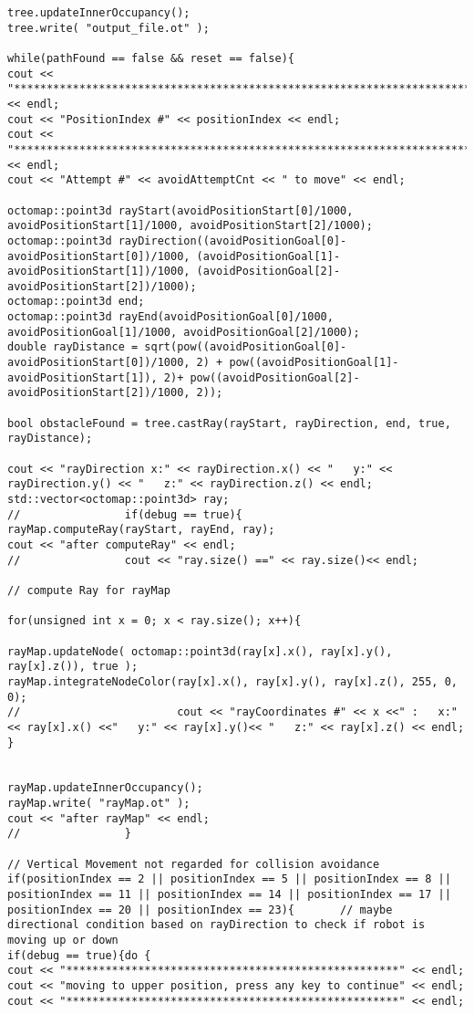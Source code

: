 \begin{lstlisting}[frame = single, label={lst:cppread1}]
tree.updateInnerOccupancy();
tree.write( "output_file.ot" );

while(pathFound == false && reset == false){
cout << "***********************************************************************" << endl;
cout << "PositionIndex #" << positionIndex << endl;
cout << "***********************************************************************" << endl;
cout << "Attempt #" << avoidAttemptCnt << " to move" << endl;

octomap::point3d rayStart(avoidPositionStart[0]/1000, avoidPositionStart[1]/1000, avoidPositionStart[2]/1000);
octomap::point3d rayDirection((avoidPositionGoal[0]-avoidPositionStart[0])/1000, (avoidPositionGoal[1]-avoidPositionStart[1])/1000, (avoidPositionGoal[2]-avoidPositionStart[2])/1000);
octomap::point3d end;
octomap::point3d rayEnd(avoidPositionGoal[0]/1000, avoidPositionGoal[1]/1000, avoidPositionGoal[2]/1000);
double rayDistance = sqrt(pow((avoidPositionGoal[0]-avoidPositionStart[0])/1000, 2) + pow((avoidPositionGoal[1]-avoidPositionStart[1]), 2)+ pow((avoidPositionGoal[2]-avoidPositionStart[2])/1000, 2));

bool obstacleFound = tree.castRay(rayStart, rayDirection, end, true, rayDistance);

cout << "rayDirection x:" << rayDirection.x() << "   y:" << rayDirection.y() << "   z:" << rayDirection.z() << endl;
std::vector<octomap::point3d> ray;
//                if(debug == true){
rayMap.computeRay(rayStart, rayEnd, ray);
cout << "after computeRay" << endl;
//                cout << "ray.size() ==" << ray.size()<< endl;

// compute Ray for rayMap

for(unsigned int x = 0; x < ray.size(); x++){

rayMap.updateNode( octomap::point3d(ray[x].x(), ray[x].y(), ray[x].z()), true );
rayMap.integrateNodeColor(ray[x].x(), ray[x].y(), ray[x].z(), 255, 0, 0);
//                        cout << "rayCoordinates #" << x <<" :   x:" << ray[x].x() <<"   y:" << ray[x].y()<< "   z:" << ray[x].z() << endl;
}


rayMap.updateInnerOccupancy();
rayMap.write( "rayMap.ot" );
cout << "after rayMap" << endl;
//                }

// Vertical Movement not regarded for collision avoidance
if(positionIndex == 2 || positionIndex == 5 || positionIndex == 8 || positionIndex == 11 || positionIndex == 14 || positionIndex == 17 || positionIndex == 20 || positionIndex == 23){       // maybe directional condition based on rayDirection to check if robot is moving up or down
if(debug == true){do {
cout << "***************************************************" << endl;
cout << "moving to upper position, press any key to continue" << endl;
cout << "***************************************************" << endl;


\end{lstlisting}
